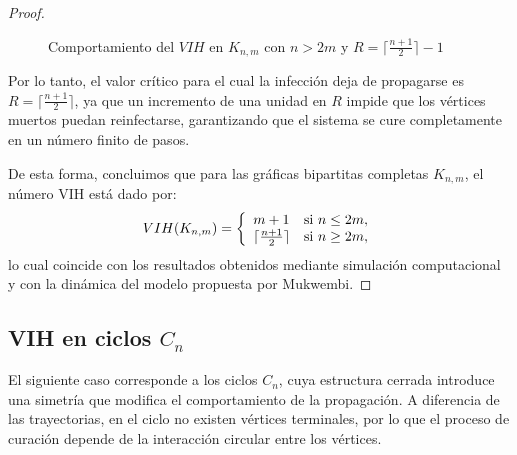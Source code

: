 \documentclass[12pt,titlepage,twoside,openright]{book}
\begin{document}
\begin{proof}
\begin{figure}[h]
\begin{subfigure}[h]{0.41\linewidth}
    \end{subfigure}
    \caption{Comportamiento del $VIH$ en $K_{n,m}$ con $n>2m$ y $R=\lceil \frac{n+1}{2}\rceil-1$}
    \label{KnmyR=VIH-1,n>2m}
    \end{figure}

    Por lo tanto, el valor cr\'itico para el cual la infecci\'on deja de propagarse es $R = \lceil \tfrac{n+1}{2}\rceil$, ya que un incremento de una unidad en $R$ impide que los v\'ertices muertos puedan reinfectarse, garantizando que el sistema se cure completamente en un n\'umero finito de pasos.

    De esta forma, concluimos que para las gr\'aficas bipartitas completas $K_{n,m}$, el n\'umero VIH est\'a dado por: $$ VIH(K_{n,m}) = \left\lbrace \begin{array}{ll} m+1 & \textup{si } n \leq 2m,\\ \lceil \tfrac{n+1}{2} \rceil & \textup{si } n \geq 2m, \end{array} \right.$$ lo cual coincide con los resultados obtenidos mediante simulaci\'on computacional y con la din\'amica del modelo propuesta por Mukwembi.
\end{proof}
\subsection{VIH en ciclos $C_n$}
El siguiente caso corresponde a los ciclos $C_n$, cuya estructura cerrada introduce una simetr\'ia que modifica el comportamiento de la propagaci\'on. A diferencia de las trayectorias, en el ciclo no existen v\'ertices terminales, por lo que el proceso de curaci\'on depende de la interacci\'on circular entre los v\'ertices.
\end{document}
